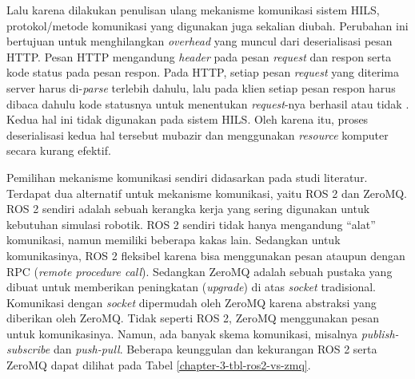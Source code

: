 Lalu karena dilakukan penulisan ulang mekanisme komunikasi sistem HILS,
protokol/metode komunikasi yang digunakan juga sekalian diubah. Perubahan ini
bertujuan untuk menghilangkan \textit{overhead} yang muncul dari deserialisasi
pesan HTTP. Pesan HTTP mengandung \textit{header} pada pesan \textit{request}
dan respon serta kode status pada pesan respon. Pada HTTP, setiap pesan
\textit{request} yang diterima server harus di-\textit{parse} terlebih dahulu,
lalu pada klien setiap pesan respon harus dibaca dahulu kode statusnya untuk
menentukan \textit{request}-nya berhasil atau tidak \parencite{rfc9110}. Kedua
hal ini tidak digunakan pada sistem HILS. Oleh karena itu, proses deserialisasi
kedua hal tersebut mubazir dan menggunakan \textit{resource} komputer secara
kurang efektif.

Pemilihan mekanisme komunikasi sendiri didasarkan pada studi literatur.
Terdapat dua alternatif untuk mekanisme komunikasi, yaitu ROS 2 dan ZeroMQ.
ROS 2 sendiri adalah sebuah kerangka kerja yang sering digunakan untuk kebutuhan
simulasi robotik. ROS 2 sendiri tidak hanya mengandung ``alat'' komunikasi,
namun memiliki beberapa kakas lain. Sedangkan untuk komunikasinya, ROS 2
fleksibel karena bisa menggunakan pesan ataupun dengan RPC (\textit{remote
	procedure call}). Sedangkan ZeroMQ adalah sebuah pustaka yang dibuat untuk
memberikan peningkatan (\textit{upgrade}) di atas \textit{socket}
tradisional. Komunikasi dengan \textit{socket} dipermudah oleh ZeroMQ karena
abstraksi yang diberikan oleh ZeroMQ. Tidak seperti ROS 2, ZeroMQ menggunakan
pesan untuk komunikasinya. Namun, ada banyak skema komunikasi, misalnya
\textit{publish-subscribe} dan \textit{push-pull}. Beberapa keunggulan dan
kekurangan ROS 2 serta ZeroMQ dapat dilihat pada Tabel
\ref{chapter-3-tbl-ros2-vs-zmq}.

